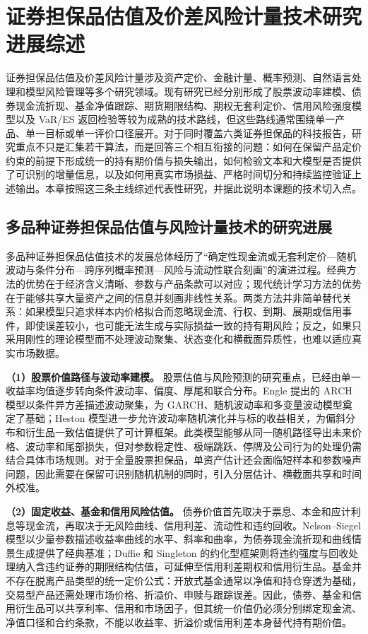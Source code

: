 \chapter{证券担保品估值及价差风险计量技术研究进展综述}

证券担保品估值及价差风险计量涉及资产定价、金融计量、概率预测、自然语言处理和模型风险管理等多个研究领域。现有研究已经分别形成了股票波动率建模、债券现金流折现、基金净值跟踪、期货期限结构、期权无套利定价、信用风险强度模型以及 VaR/ES 返回检验等较为成熟的技术路线，但这些路线通常围绕单一产品、单一目标或单一评价口径展开。对于同时覆盖六类证券担保品的科技报告，研究重点不只是汇集若干算法，而是回答三个相互衔接的问题：如何在保留产品定价约束的前提下形成统一的持有期价值与损失输出，如何检验文本和大模型是否提供了可识别的增量信息，以及如何用真实市场损益、严格时间切分和持续监控验证上述输出。本章按照这三条主线综述代表性研究，并据此说明本课题的技术切入点。

\section{多品种证券担保品估值与风险计量技术的研究进展}

多品种证券担保品估值技术的发展总体经历了“确定性现金流或无套利定价—随机波动与条件分布—跨序列概率预测—风险与流动性联合刻画”的演进过程。经典方法的优势在于经济含义清晰、参数与产品条款可以对应；现代统计学习方法的优势在于能够共享大量资产之间的信息并刻画非线性关系。两类方法并非简单替代关系：如果模型只追求样本内价格拟合而忽略现金流、行权、到期、展期或信用事件，即使误差较小，也可能无法生成与实际损益一致的持有期风险；反之，如果只采用刚性的理论模型而不处理波动聚集、状态变化和横截面异质性，也难以适应真实市场数据。

\textbf{（1）股票价值路径与波动率建模。}
股票估值与风险预测的研究重点，已经由单一收益率均值逐步转向条件波动率、偏度、厚尾和联合分布。Engle 提出的 ARCH 模型以条件异方差描述波动聚集，为 GARCH、随机波动率和多变量波动模型奠定了基础\cite{engle_1982}；Heston 模型进一步允许波动率随机演化并与标的收益相关，为偏斜分布和衍生品一致估值提供了可计算框架\cite{heston_1993}。此类模型能够从同一随机路径导出未来价格、波动率和尾部损失，但对参数稳定性、极端跳跃、停牌及公司行为的处理仍需结合具体市场规则。对于全量股票担保品，单资产估计还会面临短样本和参数噪声问题，因此需要在保留可识别随机机制的同时，引入分层估计、横截面共享和时间外校准。

\textbf{（2）固定收益、基金和信用风险估值。}
债券价值首先取决于票息、本金和应计利息等现金流，再取决于无风险曲线、信用利差、流动性和违约回收。Nelson--Siegel 模型以少量参数描述收益率曲线的水平、斜率和曲率，为债券现金流折现和曲线情景生成提供了经典基准\cite{nelson_siegel_1987}；Duffie 和 Singleton 的约化型框架则将违约强度与回收处理纳入含违约证券的期限结构估值，可延伸至信用利差期权和信用衍生品\cite{duffie_singleton_1999}。基金并不存在脱离产品类型的统一定价公式：开放式基金通常以净值和持仓穿透为基础，交易型产品还需处理市场价格、折溢价、申赎与跟踪误差。因此，债券、基金和信用衍生品可以共享利率、信用和市场因子，但其统一价值仍必须分别绑定现金流、净值口径和合约条款，不能以收益率、折溢价或信用利差本身替代持有期价值。

